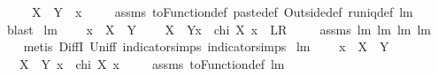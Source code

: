 \begin{isabellebody}
\ \ \ {\isachardoublequoteopen}{}\ {\isasymin}\ {\isacharparenleft}X\ {\isacharless}{\isacharbar}{\isacharbar}\ Y{\isacharparenright}\ {\isacharbackquote}{\isacharbackquote}\ {\isacharbraceleft}x{\isacharbraceright}{\isachardoublequoteclose}\ \isanewline
%
\isadelimproof
\ \ %
\endisadelimproof
%
\isatagproof
{}\isamarkupfalse%
\ assms\ toFunction{\isacharunderscore}def\ paste{\isacharunderscore}def\ Outside{\isacharunderscore}def\ runiq{\isacharunderscore}def\ lm{}{}{}\ \isamarkupfalse%
\ blast%
\endisatagproof
{\isafoldproof}%
%
\isadelimproof
\isanewline
%
\endisadelimproof
\isanewline
{}\isamarkupfalse%
\ lm{}{}{}{\isacharcolon}\ \isanewline
\ \ \ {\isachardoublequoteopen}x\ {\isasymin}\ X\ {\isasymunion}\ Y{\isachardoublequoteclose}\ \isanewline
\ \ \ {\isachardoublequoteopen}{\isacharparenleft}X\ {\isacharless}{\isacharbar}{\isacharbar}\ Y{\isacharparenright}{\isacharcomma}{\isacharcomma}x\ {\isacharequal}\ chi\ X\ x{\isachardoublequoteclose}\ {\isacharparenleft}\ {\isachardoublequoteopen}{\isacharquery}L{\isacharequal}{\isacharquery}R{\isachardoublequoteclose}{\isacharparenright}\ \isanewline
%
\isadelimproof
\ \ %
\endisadelimproof
%
\isatagproof
{}\isamarkupfalse%
\ assms\ lm{}{}{}\ lm{}{}{}\ lm{}{}{}\ lm{}{}{}\ \isanewline
\ \ \isamarkupfalse%
\ {\isacharparenleft}metis\ DiffI\ Un{\isacharunderscore}iff\ indicator{\isacharunderscore}simps{\isacharparenleft}{}{\isacharparenright}\ indicator{\isacharunderscore}simps{\isacharparenleft}{}{\isacharparenright}{\isacharparenright}%
\endisatagproof
{\isafoldproof}%
%
\isadelimproof
\isanewline
%
\endisadelimproof
\isanewline
{}\isamarkupfalse%
\ lm{}{}{}{\isacharcolon}\ \isanewline
\ \ \ {\isachardoublequoteopen}x\ {\isasymin}\ X\ {\isasymunion}\ Y{\isachardoublequoteclose}\ \isanewline
\ \ \ {\isachardoublequoteopen}{\isacharparenleft}X\ {\isacharless}{\isacharbar}\ Y{\isacharparenright}\ x\ {\isacharequal}\ chi\ X\ x{\isachardoublequoteclose}\ \isanewline
%
\isadelimproof
\ \ %
\endisadelimproof
%
\isatagproof
{}\isamarkupfalse%
\ assms\ toFunction{\isacharunderscore}def\ lm{}{}{}\ \isamarkupfalse%

\end{isabellebody}
